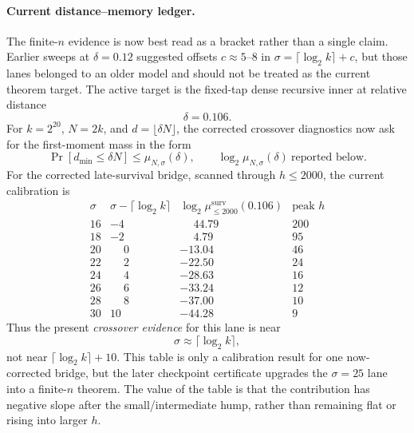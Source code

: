 \paragraph{Current distance--memory ledger.}
The finite-\(n\) evidence is now best read as a bracket rather than a single claim. Earlier sweeps at
\(\delta=0.12\) suggested offsets \(c\approx 5\text{--}8\) in
\(\sigma=\lceil\log_2 k\rceil+c\), but those lanes belonged to an older model and should not be treated as the
current theorem target. The active target is the fixed-tap dense recursive inner at relative distance
\[
\delta=0.106.
\]
For \(k=2^{20}\), \(N=2k\), and \(d=\lfloor\delta N\rfloor\), the corrected crossover diagnostics now ask for the
first-moment mass in the form
\[
\Pr[d_{\min}\le \delta N]\le \mu_{N,\sigma}(\delta),
\qquad
\log_2\mu_{N,\sigma}(\delta)\ \text{reported below.}
\]
For the corrected late-survival bridge, scanned through \(h\le2000\), the current calibration is
\[
\begin{array}{c|c|c|c}
\sigma & \sigma-\lceil\log_2 k\rceil & \log_2\mu_{\le2000}^{\mathrm{surv}}(0.106) & \text{peak }h\\
\hline
16 & -4 & \phantom{-}44.79 & 200\\
18 & -2 & \phantom{-}4.79  & 95\\
20 & \phantom{-}0 & -13.04 & 46\\
22 & \phantom{-}2 & -22.50 & 24\\
24 & \phantom{-}4 & -28.63 & 16\\
26 & \phantom{-}6 & -33.24 & 12\\
28 & \phantom{-}8 & -37.00 & 10\\
30 & 10 & -44.28 & 9
\end{array}
\]
Thus the present \emph{crossover evidence} for this lane is near
\[
\sigma\approx \lceil\log_2 k\rceil,
\]
not near \(\lceil\log_2 k\rceil+10\). This table is only a calibration result for one now-corrected bridge, but the
later checkpoint certificate upgrades the \(\sigma=25\) lane into a finite-\(n\) theorem.  The value of the table is
that the contribution has negative slope after the small/intermediate hump, rather than remaining flat or rising into
larger \(h\).

